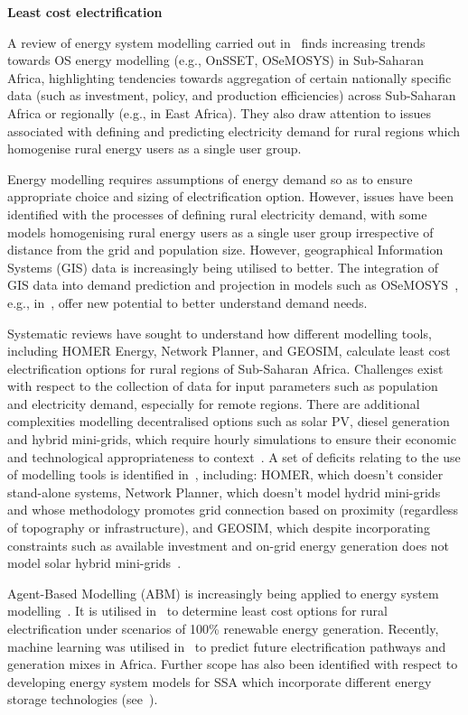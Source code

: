 \textbf{Least cost electrification}

A review of energy system modelling carried out in~\cite{rocco-fumagalli-ea-2021} finds increasing trends towards OS energy modelling (e.g., OnSSET, OSeMOSYS) in Sub-Saharan Africa, highlighting tendencies towards aggregation of certain nationally specific data (such as investment, policy, and production efficiencies) across Sub-Saharan Africa or regionally (e.g., in East Africa). They also draw attention to issues associated with defining and predicting electricity demand for rural regions which homogenise rural energy users as a single user group.

Energy modelling requires assumptions of energy demand so as to ensure appropriate choice and sizing of electrification option. However, issues have been identified with the processes of defining rural electricity demand, with some models homogenising rural energy users as a single user group irrespective of distance from the grid and population size. However, geographical Information Systems (GIS) data is increasingly being utilised to better. The integration of GIS data into demand prediction and projection in models such as OSeMOSYS~\cite{howells-rogner-ea-2011}, e.g., in~\cite{rocco-fumagalli-ea-2021}, offer new potential to better understand demand needs.

Systematic reviews have sought to understand how different modelling tools, including HOMER Energy, Network Planner, and GEOSIM, calculate least cost electrification options for rural regions of Sub-Saharan Africa. Challenges exist with respect to the collection of data for input parameters such as population and electricity demand, especially for remote regions. There are additional complexities modelling decentralised options such as solar PV, diesel generation and hybrid mini-grids,  which require hourly simulations to ensure their economic and technological appropriateness to context~\cite{cader-blechinger-ea-2016}. A set of deficits relating to the use of modelling tools is identified in~\cite{cader-blechinger-ea-2016}, including: HOMER, which doesn’t consider stand-alone systems, Network Planner, which doesn’t model hydrid mini-grids and whose methodology promotes grid connection based on  proximity (regardless of topography or infrastructure), and GEOSIM, which despite incorporating constraints such as available investment and on-grid energy generation does not model solar hybrid mini-grids~\cite{cader-blechinger-ea-2016}.

Agent-Based Modelling (ABM) is increasingly being applied to energy system modelling~\cite{alfaro-miller-2021,riva-colombo-2020}. It is utilised in~\cite{alfaro-miller-2021} to determine least cost options for rural electrification under scenarios of 100\% renewable energy generation. Recently, machine learning was utilised in~\cite{alova-trotter-ea-2021} to predict future electrification pathways and generation mixes in Africa. Further scope has also been identified with respect to developing energy system models for SSA which incorporate different energy storage technologies (see~\cite{musonye-davidsdottir-ea-2020}).